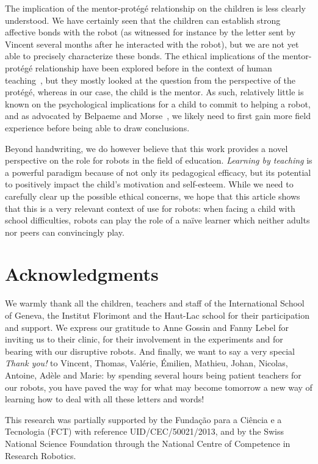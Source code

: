 \documentclass{article}
\begin{document}
The implication of the mentor-protégé relationship on the children is less
clearly understood. We have certainly seen that the children can establish
strong affective bonds with the robot (as witnessed for instance by the letter
sent by Vincent several months after he interacted with the robot), but we are
not yet able to precisely characterize these bonds. The ethical implications of
the mentor-protégé relationship have been explored before in the context of
human teaching~\cite{brad1999mentor,wendelyn2008context}, but they mostly looked
at the question from the perspective of the protégé, whereas in our case, the
child is the mentor. As such, relatively little is known on the psychological
implications for a child to commit to helping a robot, and as advocated by
Belpaeme and Morse~\cite{belpaeme2010time}, we likely need to first gain more
field experience before being able to draw conclusions.

Beyond handwriting, we do however believe that this work provides a novel
perspective on the role for robots in the field of education. \emph{Learning by
teaching} is a powerful paradigm because of not only its pedagogical efficacy,
but its potential to positively impact the child's motivation and self-esteem.
While we need to carefully clear up the possible ethical concerns, we hope that
this article shows that this is a very relevant context of use for robots: when
facing a child with school difficulties, robots can play the role of a naïve
learner which neither adults nor peers can convincingly play.


\section*{Acknowledgments}

We warmly thank all the children, teachers and staff of the International School
of Geneva, the Institut Florimont and the Haut-Lac school for their
participation and support. We express our gratitude to Anne Gossin and Fanny
Lebel for inviting us to their clinic, for their involvement in the experiments
and for bearing with our disruptive robots. And finally, we want to say a very
special \emph{Thank you!} to Vincent, Thomas, Valérie, Émilien, Mathieu, Johan,
Nicolas, Antoine, Adèle and Marie: by spending several hours being patient
teachers for our robots, you have paved the way for what may become tomorrow a
new way of learning how to deal with all these letters and words!

This research was partially supported by the Funda\c{c}\~{a}o para a Ci\^{e}ncia
e a Tecnologia (FCT) with reference UID/CEC/50021/2013, and by the Swiss
National Science Foundation through the National Centre of Competence in
Research Robotics.



\end{document}
